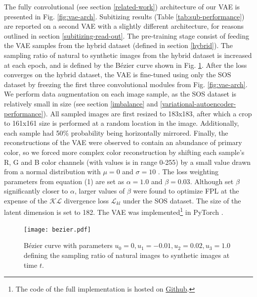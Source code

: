 \documentclass[twocolumn]{article}
\begin{document}
The fully convolutional (see section \ref{related-work}) architecture of our VAE is presented in Fig. \ref{fig:vae-arch}. Subitizing results (Table \ref{tab:sub-performance}) are reported on a second VAE with a slightly different architecture, for reasons outlined in section \ref{subitizing-read-out}.
The pre-training stage consist of feeding the VAE samples from the hybrid dataset (defined in section \ref{hybrid}). The sampling ratio of natural to synthetic images from the hybrid dataset is increased at each epoch, and is defined by the Bézier curve shown in Fig. \ref{fig:bezier}. After the loss converges on the hybrid dataset, the VAE is fine-tuned using only the SOS dataset by freezing the first three convolutional modules from Fig. \ref{fig:vae-arch}. We perform data augmentation on each image sample, as the SOS dataset is relatively small in size (see section \ref{imbalance} and \ref{variational-autoencoder-performance}).  All sampled images are first resized to 183x183, after which a crop to 161x161 size is performed at a random location in the image. Additionally, each sample had 50\% probability being horizontally mirrored. Finally, the reconstructions of the VAE were observed to contain an abundance of primary color, so we forced more complex color reconstruction by shifting each sample's R, G and B color channels (with values is in range 0-255) by a small value drawn from a normal distribution with \(\mu=0\) and \(\sigma=10\) \citep[the G channel uses \(\sigma=3.5\) because heavy green shifts produced unrealistic samples, possibly because green lighting contributes most to human color intensity perception][]{anderson1996proposal}. The loss weighting parameters from equation (1) are set as \(\alpha=1.0\) and \(\beta=0.03\). Although \citet{hou2017deep} set \(\beta\) significantly closer to \(\alpha\), larger values of \(\beta\) were found to optimize FPL at the expense of the \(\mathcal{KL}\) divergence loss \(\mathcal{L}_{kl}\) under the SOS dataset. The size of the latent dimension is set to 182. The VAE was implemented\footnote{The code of the full implementation is hosted on \href{https://github.com/rien333/numbersense-vae}{Github}.} in PyTorch \citep{paszke2017automatic}. 

\begin{figure}
\centering
\texttt{[image: bezier.pdf]}
\caption{Bézier curve with parameters
\(u_0=0, u_1=-0.01, u_2=0.02, u_3=1.0\) defining the sampling ratio of natural images to synthetic images at time \(t\). }
\label{fig:bezier}
\end{figure}
\end{document}
